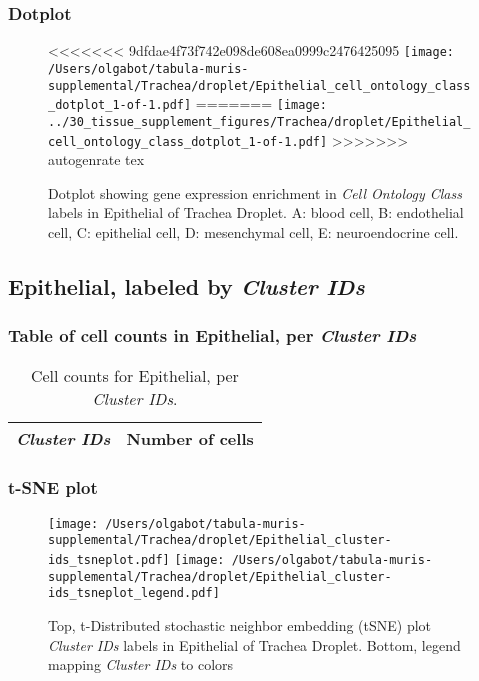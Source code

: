 \clearpage

\subsubsection{Dotplot}
\begin{figure}[h]
\centering
<<<<<<< 9dfdae4f73f742e098de608ea0999c2476425095
\texttt{[image: /Users/olgabot/tabula-muris-supplemental/Trachea/droplet/Epithelial\_cell\_ontology\_class\_dotplot\_1-of-1.pdf]}
=======
\texttt{[image: ../30\_tissue\_supplement\_figures/Trachea/droplet/Epithelial\_cell\_ontology\_class\_dotplot\_1-of-1.pdf]}
>>>>>>> autogenrate tex

\caption{ Dotplot  showing gene expression enrichment in \emph{Cell Ontology Class} labels in Epithelial of Trachea Droplet. A: blood cell, B: endothelial cell, C: epithelial cell, D: mesenchymal cell, E: neuroendocrine cell.}
\end{figure}


\clearpage

\subsection{Epithelial, labeled by \emph{Cluster IDs}}
\subsubsection{Table of cell counts in Epithelial, per \emph{Cluster IDs}}\begin{table}[h]
\centering
\label{my-label}
\begin{tabular}{@{}ll@{}}
\toprule

\emph{Cluster IDs}& Number of cells \\ \midrule\bottomrule
\end{tabular}
\caption{Cell counts for Epithelial, per \emph{Cluster IDs}.}
\end{table}

\clearpage
\subsubsection{t-SNE plot}
\begin{figure}[h]
\centering
\texttt{[image: /Users/olgabot/tabula-muris-supplemental/Trachea/droplet/Epithelial\_cluster-ids\_tsneplot.pdf]}
\texttt{[image: /Users/olgabot/tabula-muris-supplemental/Trachea/droplet/Epithelial\_cluster-ids\_tsneplot\_legend.pdf]}
\caption{Top, t-Distributed stochastic neighbor embedding (tSNE) plot  \emph{Cluster IDs} labels in Epithelial of Trachea Droplet. Bottom, legend mapping \emph{Cluster IDs} to colors}
\end{figure}


